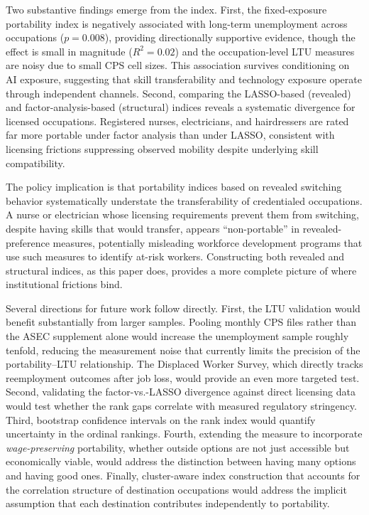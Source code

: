 \documentclass[12pt]{article}
\begin{document}
Two substantive findings emerge from the index. First, the fixed-exposure portability index is negatively associated with long-term unemployment across occupations ($p = 0.008$), providing directionally supportive evidence, though the effect is small in magnitude ($R^2 = 0.02$) and the occupation-level LTU measures are noisy due to small CPS cell sizes. This association survives conditioning on AI exposure, suggesting that skill transferability and technology exposure operate through independent channels. Second, comparing the LASSO-based (revealed) and factor-analysis-based (structural) indices reveals a systematic divergence for licensed occupations. Registered nurses, electricians, and hairdressers are rated far more portable under factor analysis than under LASSO, consistent with licensing frictions suppressing observed mobility despite underlying skill compatibility.

The policy implication is that portability indices based on revealed switching behavior systematically understate the transferability of credentialed occupations. A nurse or electrician whose licensing requirements prevent them from switching, despite having skills that would transfer, appears ``non-portable'' in revealed-preference measures, potentially misleading workforce development programs that use such measures to identify at-risk workers. Constructing both revealed and structural indices, as this paper does, provides a more complete picture of where institutional frictions bind.

Several directions for future work follow directly. First, the LTU validation would benefit substantially from larger samples. Pooling monthly CPS files rather than the ASEC supplement alone would increase the unemployment sample roughly tenfold, reducing the measurement noise that currently limits the precision of the portability--LTU relationship. The Displaced Worker Survey, which directly tracks reemployment outcomes after job loss, would provide an even more targeted test. Second, validating the factor-vs.-LASSO divergence against direct licensing data \citep{kleiner2013} would test whether the rank gaps correlate with measured regulatory stringency. Third, bootstrap confidence intervals on the rank index would quantify uncertainty in the ordinal rankings. Fourth, extending the measure to incorporate \emph{wage-preserving} portability, whether outside options are not just accessible but economically viable, would address the distinction between having many options and having good ones. Finally, cluster-aware index construction that accounts for the correlation structure of destination occupations would address the implicit assumption that each destination contributes independently to portability.
\end{document}
